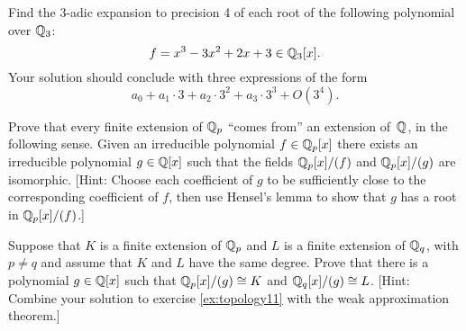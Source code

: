 \begin{exercise}\label{ex:topology10}
Find the $3$-adic expansion to precision 4 of each root of the following polynomial over $\mathbb{Q}_3$:
$$
  f = x^3 - 3x^2 + 2x + 3 \in \mathbb{Q}_3[x].
$$
Your solution should conclude with three expressions of the form 
$$a_0 + a_1\cdot 3 + a_2\cdot 3^2 + a_3 \cdot 3^3 + O(3^4).$$
\end{exercise}

\begin{exercise}\label{ex:topology11}
  Prove that every finite extension of
  $\mathbb{Q}_p$ ``comes from'' an extension of~$\mathbb{Q}$, in the following sense.
  Given an irreducible polynomial $f\in\mathbb{Q}_p[x]$ there exists an
  irreducible polynomial $g\in \mathbb{Q}[x]$ such that the fields
  $\mathbb{Q}_p[x]/(f)$ and $\mathbb{Q}_p[x]/(g)$ are isomorphic.  [Hint: Choose each
  coefficient of $g$ to be sufficiently close to the corresponding
  coefficient of $f$, then use Hensel's lemma to show that $g$ has a
  root in $\mathbb{Q}_p[x]/(f)$.]
\end{exercise}

\begin{exercise}\label{ex:topology12}
Suppose that $K$ is a finite extension of $\mathbb{Q}_p$ and $L$
is a finite extension of $\mathbb{Q}_q$, with $p\neq q$ and assume
that $K$ and $L$ have the same degree.  Prove that
there is a polynomial $g\in \mathbb{Q}[x]$ such that $\mathbb{Q}_p[x]/(g)\cong K$
and $\mathbb{Q}_q[x]/(g)\cong L$.  [Hint: Combine your solution to exercise \ref{ex:topology11} with the weak approximation theorem.]
\end{exercise}




